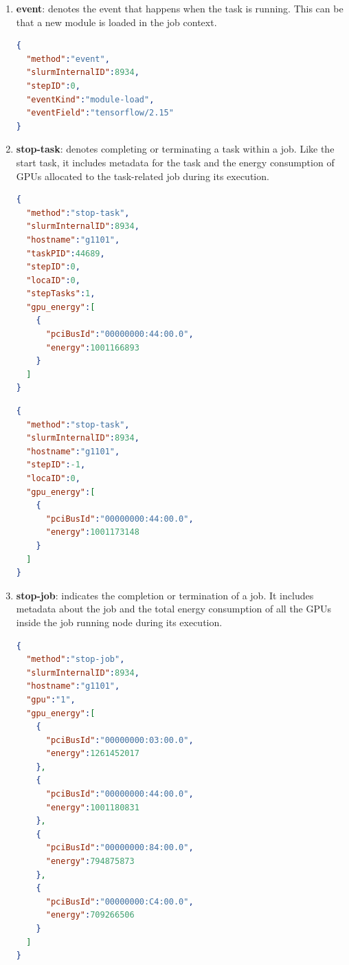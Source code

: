 \begin{enumerate}
    \item \textbf{event}: denotes the event that happens when the task is running. This can be that a new module is loaded in the job context.

\begin{lstlisting}[language=JSON]
{
  "method":"event",
  "slurmInternalID":8934,
  "stepID":0,
  "eventKind":"module-load",
  "eventField":"tensorflow/2.15"
}

\end{lstlisting}

    \item \textbf{stop-task}: denotes completing or terminating a task within a job. Like the start task, it includes metadata for the task and the energy consumption of GPUs allocated to the task-related job during its execution.

\clearpage

\begin{lstlisting}[language=JSON]
{
  "method":"stop-task",
  "slurmInternalID":8934,
  "hostname":"g1101",
  "taskPID":44689,
  "stepID":0,
  "locaID":0,
  "stepTasks":1,
  "gpu_energy":[
    {
      "pciBusId":"00000000:44:00.0",
      "energy":1001166893
    }
  ]
}
\end{lstlisting}

\begin{lstlisting}[language=JSON]
{
  "method":"stop-task",
  "slurmInternalID":8934,
  "hostname":"g1101",
  "stepID":-1,
  "locaID":0,
  "gpu_energy":[
    {
      "pciBusId":"00000000:44:00.0",
      "energy":1001173148
    }
  ]
}
\end{lstlisting}

    \item \textbf{stop-job}: indicates the completion or termination of a job. It includes metadata about the job and the total energy consumption of all the GPUs inside the job running node during its execution.

\begin{lstlisting}[language=JSON]
{
  "method":"stop-job",
  "slurmInternalID":8934,
  "hostname":"g1101",
  "gpu":"1",
  "gpu_energy":[
    {
      "pciBusId":"00000000:03:00.0",
      "energy":1261452017
    },
    {
      "pciBusId":"00000000:44:00.0",
      "energy":1001180831
    },
    {
      "pciBusId":"00000000:84:00.0",
      "energy":794875873
    },
    {
      "pciBusId":"00000000:C4:00.0",
      "energy":709266506
    }
  ]
}
\end{lstlisting}

\end{enumerate}

